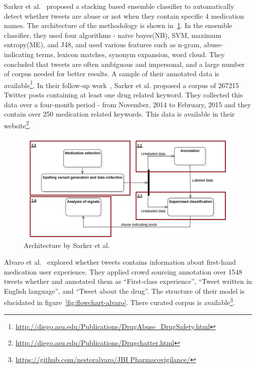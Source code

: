 Sarker et al.~\cite{sarker2016social} proposed a stacking based ensemble classifier to automatically detect whether tweets are abuse or not when they contain specific 4 medication names. The architecture of the methodology is shown in~\ref{fig:model-sarker}. In the ensemble classifier, they used four algorithms - naive bayes(NB), SVM, maximum entropy(ME), and J48, and used various features such as n-gram, abuse-indicating terms, lexicon matches, synonym expansion, word cloud. They concluded that tweets are often ambiguous and impersonal, and a large number of corpus needed for better results. A sample of their annotated data is available\footnote{\url{http://diego.asu.edu/Publications/DrugAbuse_DrugSafety.html}}. In  their  follow-up  work~\cite{sarker2017corpus}, Sarker et al. proposed a corpus  of  267215  Twitter  posts  containing  at least one drug related keyword. They collected this data  over a four-month  period - from  November, 2014  to  February, 2015 and they contain over 250 medication related keywords. This data is available in their website\footnote{\url{http://diego.asu.edu/Publications/Drugchatter.html}}.

\begin{figure}[h]
	\centering
	\includegraphics[width=0.99\linewidth]{Figures/h.png}
	\caption{Architecture by Sarker et al.~\cite{sarker2016social}}
	\label{fig:model-sarker}
\end{figure}

Alvaro et al.~\cite{alvaro2015crowdsourcing} explored whether tweets contains information about first-hand medication user experience. They applied crowd sourcing annotation over 1548 tweets whether and annotated them as “First-class experience”, “Tweet written in English language”, and “Tweet about the drug”. The structure of their model is elucidated in figure~\ref{fig:flowchart-alvaro}. There curated corpus is available\footnote{\url{https://github.com/nestoralvaro/JBI Pharmacovigilance/}}.

